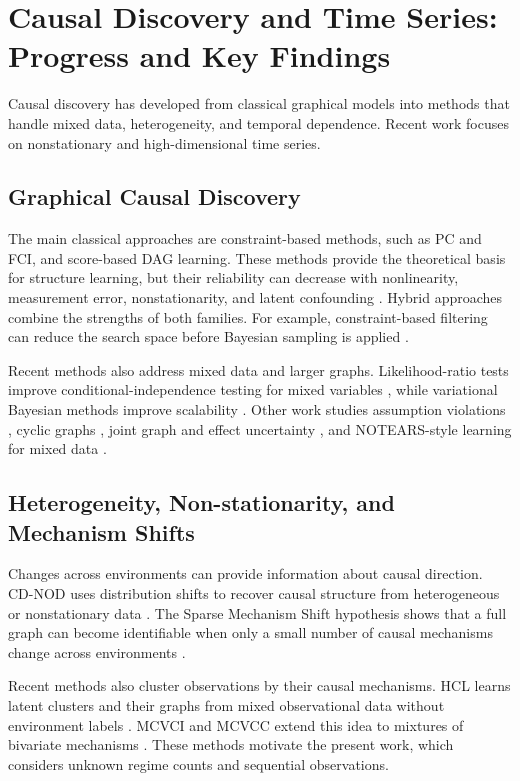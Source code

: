 \section{Causal Discovery and Time Series: Progress and Key Findings}
\label{sec:survey}

Causal discovery has developed from classical graphical models into methods that
handle mixed data, heterogeneity, and temporal dependence. Recent work focuses on
nonstationary and high-dimensional time series.

\subsection{Graphical Causal Discovery}

The main classical approaches are constraint-based methods, such as PC and FCI,
and score-based DAG learning. These methods provide the theoretical basis for
structure learning, but their reliability can decrease with nonlinearity,
measurement error, nonstationarity, and latent confounding
\cite{glymour2019review}. Hybrid approaches combine the strengths of both families.
For example, constraint-based filtering can reduce the search space before Bayesian
sampling is applied \cite{kuipers2018efficient}.

Recent methods also address mixed data and larger graphs. Likelihood-ratio tests
improve conditional-independence testing for mixed variables
\cite{tsagris2018constraint}, while variational Bayesian methods improve scalability
\cite{annadani2021variational}. Other work studies assumption violations
\cite{faltenbacher2025internal}, cyclic graphs \cite{mooij2020fci}, joint graph and
effect uncertainty \cite{castelletti2021structural}, and NOTEARS-style learning for
mixed data \cite{zhao2024notearsm}.

\subsection{Heterogeneity, Non-stationarity, and Mechanism Shifts}

Changes across environments can provide information about causal direction. CD-NOD
uses distribution shifts to recover causal structure from heterogeneous or
nonstationary data \cite{huang2020causal}. The Sparse Mechanism Shift hypothesis
shows that a full graph can become identifiable when only a small number of causal
mechanisms change across environments \cite{perry2022causal}.

Recent methods also cluster observations by their causal mechanisms. HCL learns
latent clusters and their graphs from mixed observational data without environment
labels \cite{li2025hcl}. MCVCI and MCVCC extend this idea to mixtures of bivariate
mechanisms \cite{liu2025hybrid}. These methods motivate the present work, which
considers unknown regime counts and sequential observations.


